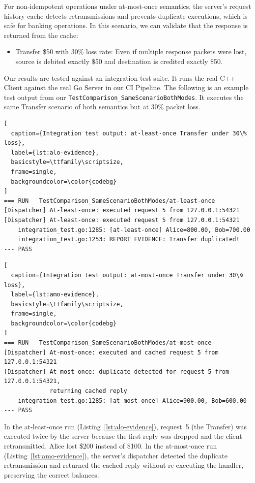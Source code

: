 \documentclass[9pt,a4paper]{article}
\begin{document}
For non-idempotent operations under at-most-once semantics, the server's request history cache detects retransmissions and prevents duplicate executions, which is safe for banking operations. In this scenario, we can validate that the response is returned from the cache:
\begin{itemize}
    \item Transfer \$50 with 30\% loss rate: Even if multiple response packets were lost, source is debited exactly \$50 and destination is credited exactly \$50.
\end{itemize}

Our results are tested against an integration test suite.
It runs the real C++ Client against the real Go Server in our CI Pipeline.
The following is an example test output from our \texttt{TestComparison\_SameScenarioBothModes}.
It executes the same Transfer scenario of both semantics but at 30\% packet loss.

\begin{lstlisting}[
  caption={Integration test output: at-least-once Transfer under 30\% loss},
  label={lst:alo-evidence},
  basicstyle=\ttfamily\scriptsize,
  frame=single,
  backgroundcolor=\color{codebg}
]
=== RUN   TestComparison_SameScenarioBothModes/at-least-once
[Dispatcher] At-least-once: executed request 5 from 127.0.0.1:54321
[Dispatcher] At-least-once: executed request 5 from 127.0.0.1:54321
    integration_test.go:1285: [at-least-once] Alice=800.00, Bob=700.00
    integration_test.go:1253: REPORT EVIDENCE: Transfer duplicated!
--- PASS
\end{lstlisting}
 
\begin{lstlisting}[
  caption={Integration test output: at-most-once Transfer under 30\% loss},
  label={lst:amo-evidence},
  basicstyle=\ttfamily\scriptsize,
  frame=single,
  backgroundcolor=\color{codebg}
]
=== RUN   TestComparison_SameScenarioBothModes/at-most-once
[Dispatcher] At-most-once: executed and cached request 5 from 127.0.0.1:54321
[Dispatcher] At-most-once: duplicate detected for request 5 from 127.0.0.1:54321,
             returning cached reply
    integration_test.go:1285: [at-most-once] Alice=900.00, Bob=600.00
--- PASS
\end{lstlisting}
 
In the at-least-once run (Listing~\ref{lst:alo-evidence}), request~5 (the Transfer) was executed twice by the server because the first reply was dropped and the client retransmitted. Alice lost \$200 instead of \$100. In the at-most-once run (Listing~\ref{lst:amo-evidence}), the server's dispatcher detected the duplicate retransmission and returned the cached reply without re-executing the handler, preserving the correct balances.
\end{document}
